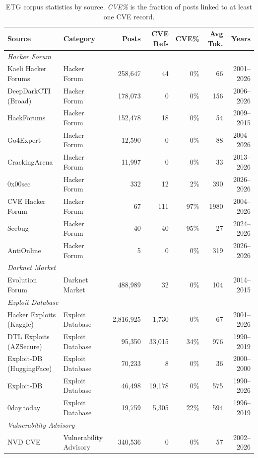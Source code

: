 \begin{table}[t]
\centering
\small
\caption{ETG corpus statistics by source. \emph{CVE\%} is the
  fraction of posts linked to at least one CVE record.}
\label{tab:corpus-stats}
\begin{tabular}{llrrrrr}
\toprule
\textbf{Source} & \textbf{Category} & \textbf{Posts} & \textbf{CVE Refs} & \textbf{CVE\%} & \textbf{Avg Tok.} & \textbf{Years} \\
\midrule
\multicolumn{7}{l}{\textit{Hacker Forum}} \\
  Kaeli Hacker Forums & Hacker Forum & 258,647 & 44 & 0\% & 66 & 2001--2026 \\
  DeepDarkCTI (Broad) & Hacker Forum & 178,073 & 0 & 0\% & 156 & 2006--2026 \\
  HackForums & Hacker Forum & 152,478 & 18 & 0\% & 54 & 2009--2015 \\
  Go4Expert & Hacker Forum & 12,590 & 0 & 0\% & 88 & 2004--2026 \\
  CrackingArena & Hacker Forum & 11,997 & 0 & 0\% & 33 & 2013--2026 \\
  0x00sec & Hacker Forum & 332 & 12 & 2\% & 390 & 2026--2026 \\
  CVE Hacker Forum & Hacker Forum & 67 & 111 & 97\% & 1980 & 2004--2026 \\
  Seebug & Hacker Forum & 40 & 40 & 95\% & 27 & 2024--2026 \\
  AntiOnline & Hacker Forum & 5 & 0 & 0\% & 319 & 2026--2026 \\
\midrule
\multicolumn{7}{l}{\textit{Darknet Market}} \\
  Evolution Forum & Darknet Market & 488,989 & 32 & 0\% & 104 & 2014--2015 \\
\midrule
\multicolumn{7}{l}{\textit{Exploit Database}} \\
  Hacker Exploits (Kaggle) & Exploit Database & 2,816,925 & 1,730 & 0\% & 67 & 2001--2026 \\
  DTL Exploits (AZSecure) & Exploit Database & 95,350 & 33,015 & 34\% & 976 & 1990--2019 \\
  Exploit-DB (HuggingFace) & Exploit Database & 70,233 & 8 & 0\% & 36 & 2000--2000 \\
  Exploit-DB & Exploit Database & 46,498 & 19,178 & 0\% & 575 & 1990--2026 \\
  0day.today & Exploit Database & 19,759 & 5,305 & 22\% & 594 & 1996--2019 \\
\midrule
\multicolumn{7}{l}{\textit{Vulnerability Advisory}} \\
  NVD CVE & Vulnerability Advisory & 340,536 & 0 & 0\% & 57 & 2002--2026 \\

\end{tabular}
\end{table}
